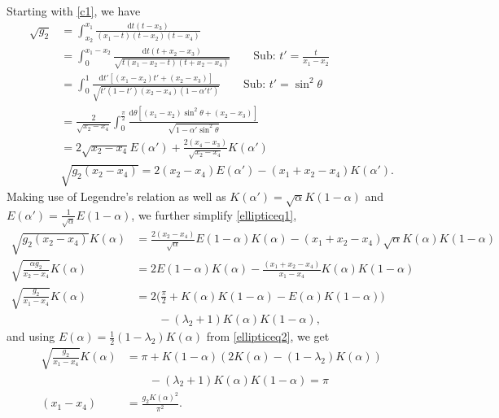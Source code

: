 \documentclass[10pt]{article}
\newcommand{\dif}{\mathrm{d}}
\theoremstyle{plain}
\theoremstyle{definition}
\theoremstyle{plain}
\begin{document}
Starting with \ref{c1}, we have
\begin{align}
	\sqrt{g_2} &= \int_{x_2}^{x_1} \frac{\dif t (t-x_3)}{(x_1-t)(t-x_2)(t-x_4)} \nonumber \\
	&= \int_0^{x_1-x_2}  \frac{\dif t(t+x_2-x_3)}{\sqrt{t(x_1-x_2-t)(t+x_2-x_4)}} \qquad \text{Sub: } t' = \frac{t}{x_1-x_2}\nonumber\\
	&= \int_0^1 \frac{\dif t' [(x_1-x_2)t'+(x_2-x_3)] }{\sqrt{t'(1-t')(x_2-x_4)(1-\alpha't')}} \qquad \text{Sub: } t' = \sin^2\theta \nonumber\\
	&= \frac{2}{\sqrt{x_2-x_4}}\int_0^{\frac{\pi}{2}} \frac{\dif\theta[(x_1-x_2)\sin^2\theta + (x_2-x_3)] }{\sqrt{1-\alpha'\sin^2\theta}} \nonumber\\
	&= 2\sqrt{x_2-x_4} E(\alpha') + \frac{2(x_4-x_3)}{\sqrt{x_2-x_4}}K(\alpha') \nonumber\\
	& \sqrt{g_2(x_2-x_4)} = 2(x_2-x_4)E(\alpha') - (x_1 + x_2 - x_4)K(\alpha'). \label{ellipticeq1}
\end{align}
Making use of Legendre's relation as well as $K(\alpha') = \sqrt{\alpha}K(1-\alpha)$ and $E(\alpha')=\frac{1}{\sqrt{\alpha}}E(1-\alpha)$, we further simplify \ref{ellipticeq1},
\begin{align*}
	\sqrt{g_2(x_2-x_4)}K(\alpha) &= \frac{2(x_2-x_4)}{\sqrt{\alpha}}E(1-\alpha)K(\alpha) - (x_1 + x_2 - x_4)\sqrt{\alpha}K(\alpha)K(1-\alpha) \\
	\sqrt{\frac{\alpha g_2}{x_2-x_4}}K(\alpha) &= 2E(1-\alpha)K(\alpha) - \frac{(x_1+x_2-x_4)}{x_1-x_4}K(\alpha)K(1-\alpha) \\
	\sqrt{\frac{g_2}{x_1-x_4}}K(\alpha)&= 2\bigg( \frac{\pi}{2} +K(\alpha)K(1-\alpha)-E(\alpha)K(1-\alpha) \bigg)\\&\qquad- (\lambda_2+1)K(\alpha)K(1-\alpha),
\end{align*}
and using $E(\alpha) = \frac{1}{2}(1-\lambda_2)K(\alpha)$ from \ref{ellipticeq2}, we get
\begin{align}
	\sqrt{\frac{g_2}{x_1-x_4}}K(\alpha) &= \pi +K(1-\alpha)(2K(\alpha)-(1-\lambda_2)K(\alpha))\nonumber\\&\qquad- (\lambda_2+1)K(\alpha)K(1-\alpha) = \pi \nonumber\\
	(x_1-x_4) &= \frac{g_2K(\alpha)^2}{\pi^2}.\label{ellipticeq3}
\end{align}
\end{document}
